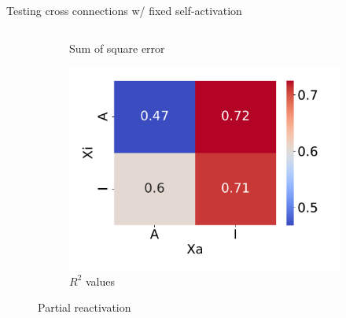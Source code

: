 \documentclass[aspectratio=169,9pt]{beamer}
\begin{document}
\begin{frame}{Testing cross connections w/ fixed self-activation}
\begin{columns}
\begin{column}{0.3\textwidth}
\begin{figure}[h]
\begin{subfigure}[b]{\textwidth}
                            \caption{Sum of square error}
                        \end{subfigure}
                        \begin{subfigure}[b]{\textwidth}
                            \centering
                            \includegraphics[width=\textwidth]{vary_cross-AA-Partial_timeshifted-rsq-hmap}
                            \caption{$R^2$ values}
                        \end{subfigure}
                    \caption{Partial reactivation}
                \end{figure}
            \end{column}
        \end{columns}
    \end{frame}
\end{document}
